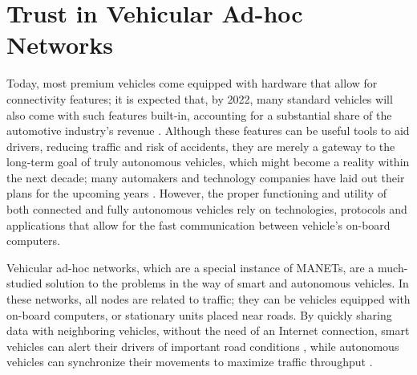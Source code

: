 \chapter{Trust in Vehicular Ad-hoc Networks}
\label{chap:vanets}

Today, most premium vehicles come equipped with hardware that allow for connectivity features; it is expected that, by 2022, many standard vehicles will also come with such features built-in, accounting for a substantial share of the automotive industry's revenue \citep{connectedcar2016}.
Although these features can be useful tools to aid drivers, reducing traffic and risk of accidents, they are merely a gateway to the long-term goal of truly autonomous vehicles, which might become a reality within the next decade; many automakers and technology companies have laid out their plans for the upcoming years \citep{tesla2016}.
However, the proper functioning and utility of both connected and fully autonomous vehicles rely on technologies, protocols and applications that allow for the fast communication between vehicle's on-board computers.

Vehicular ad-hoc networks, which are a special instance of MANETs, are a much-studied solution to the problems in the way of smart and autonomous vehicles.
In these networks, all nodes are related to traffic; they can be vehicles equipped with on-board computers, or stationary units placed near roads.
By quickly sharing data with neighboring vehicles, without the need of an Internet connection, smart vehicles can alert their drivers of important road conditions \citep{barba2012smart}, while autonomous vehicles can synchronize their movements to maximize traffic throughput \citep{amoozadeh2015platoon}.




